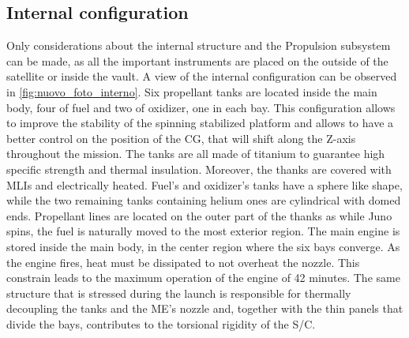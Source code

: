 \subsection{Internal configuration}
\label{subsec:internal_config}


Only considerations about the internal structure and the Propulsion subsystem can be made, as all the important instruments are placed on the outside of the satellite or inside the vault. A view of the internal configuration can be observed in \autoref{fig:nuovo_foto_interno}. Six propellant tanks are located inside the main body, four of fuel and two of oxidizer, one in each bay. This configuration allows to improve the stability of the spinning stabilized platform and allows to have a better control on the position of the CG, that will shift along the Z-axis throughout the mission. The tanks are all made of titanium to guarantee high specific strength and thermal insulation.\cite{LL_early_cruise} Moreover, the thanks are covered with MLIs and electrically heated. Fuel's and oxidizer's tanks have a sphere like shape, while the two remaining tanks containing helium ones are cylindrical with domed ends. Propellant lines are located on the outer part of the thanks as while Juno spins, the fuel is naturally moved to the most exterior region. The main engine is stored inside the main body, in the center region where the six bays converge.\cite{Leros}\cite{Juno_launch} As the engine fires, heat must be dissipated to not overheat the nozzle. This constrain leads to the maximum operation of the engine of 42 minutes.\cite{Leros} The same structure that is stressed during the launch is responsible for thermally decoupling the tanks and the ME's nozzle and, together with the thin panels that divide the bays, contributes to the torsional rigidity of the S/C.